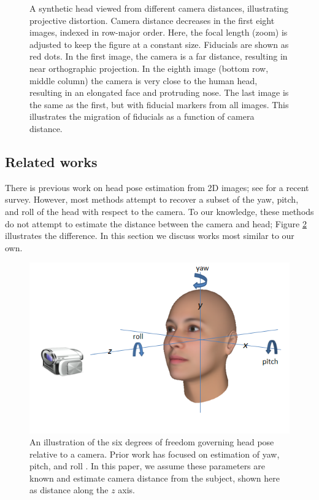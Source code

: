 \documentclass[runningheads]{llncs}
\begin{document}
\begin{figure}[ht!]
\begin{tabular}{ccc}
\end{tabular}
\caption{
A synthetic head viewed from different camera distances, illustrating projective distortion.
Camera distance decreases in the first eight images, indexed in row-major order.
Here, the focal length (zoom) is adjusted to keep the figure at a constant size.
Fiducials are shown as red dots.
In the first image, the camera is a far distance, resulting in near orthographic projection.
In the eighth image (bottom row, middle column) the camera is very close to the human head, resulting in an elongated face and protruding nose.  
The last image is the same as the first, but with fiducial markers from all images.
This illustrates the migration of fiducials as a function of camera distance. 
} 
\label{fig:fiducial_migration}
\end{figure}

\subsection{Related works} \label{sec:related}
There is previous work on head pose estimation from 2D images; see \cite{murphy2009head} for a recent survey.
However, most methods attempt to recover a subset of the yaw, pitch, and roll of the head with respect to the camera.
To our knowledge, these methods do not attempt to estimate the distance between the camera and head; Figure \ref{fig:head_pose} illustrates the difference.
In this section we discuss works most similar to our own.

\begin{figure}[ht]
\centering
\includegraphics[width=1.0\linewidth]{resources/figures/head_pose.png}
\caption{
An illustration of the six degrees of freedom governing head pose relative to a camera.
Prior work has focused on estimation of yaw, pitch, and roll \cite{murphy2009head}.
In this paper, we assume these parameters are known and estimate camera distance from the subject, shown here as distance along the $z$ axis.
}
\label{fig:head_pose}
\end{figure}
\end{document}
